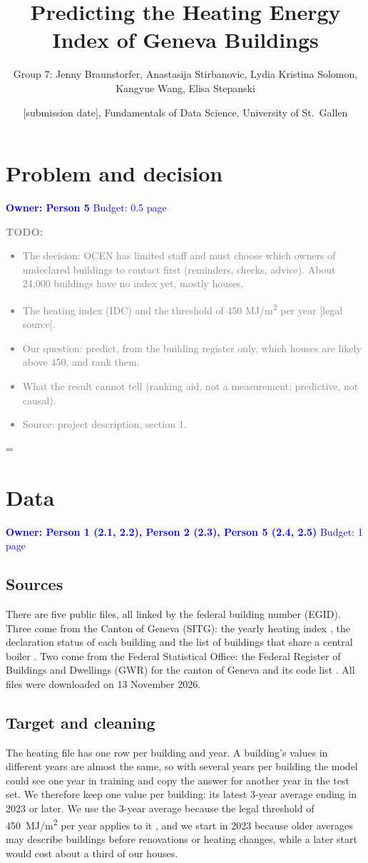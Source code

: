 \documentclass[11pt,a4paper]{article}
\title{Predicting the Heating Energy Index of Geneva Buildings}
\author{Group 7: Jenny Braunstorfer, Anastasija Stirbanovic, Lydia Kristina Solomon,\\ Kangyue Wang, Elisa Stepanski}
\date{[submission date], Fundamentals of Data Science, University of St.\ Gallen}
\newcommand{\owner}[2]{\noindent\textcolor{blue}{\textbf{Owner: #1} \quad Budget: #2}\par\medskip}
\newcommand{\todo}[1]{\noindent\textcolor{gray}{\small\textbf{TODO:} #1}\par\medskip}
\begin{document}
\maketitle

\section{Problem and decision}
\owner{Person 5}{0.5 page}
\todo{
\begin{itemize}
  \item The decision: OCEN has limited staff and must choose which owners of undeclared buildings to contact first
        (reminders, checks, advice). About 24,000 buildings have no index yet, mostly houses.
  \item The heating index (IDC) and the threshold of 450 MJ/m\textsuperscript{2} per year [legal source].
  \item Our question: predict, from the building register only, which houses are likely above 450, and rank them.
  \item What the result cannot tell (ranking aid, not a measurement; predictive, not causal).
  \item Source: project description, section 1.
\end{itemize}}

=
\section{Data}
\owner{Person 1 (2.1, 2.2), Person 2 (2.3), Person 5 (2.4, 2.5)}{1 page}

\subsection{Sources}
There are five public files, all linked by the federal building number (EGID). Three come
from the Canton of Geneva (SITG): the yearly heating index \cite{idc}, the declaration
status of each building \cite{status} and the list of buildings that share a central
boiler \cite{boilers}. Two come from the Federal Statistical Office: the Federal Register
of Buildings and Dwellings (GWR) for the canton of Geneva and its code list \cite{gwr}. All files were downloaded on 13 November 2026.

\subsection{Target and cleaning}
The heating file has one row per building and year. A building's values in
different years are almost the same, so with several years per building the model
could see one year in training and copy the answer for another year in the test set.
We therefore keep one value per building: its latest 3-year average ending in 2023
or later. We use the 3-year average because the legal threshold of
450~MJ/m\textsuperscript{2} per year applies to it \cite{ren}, and we start in 2023
because older averages may describe buildings before renovations or heating changes, while a later start would cost about a third of our houses.
\end{document}
